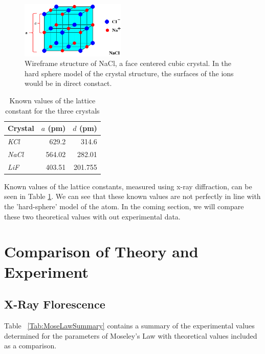 \documentclass[%
 reprint,
 amsmath,amssymb,
 aps,
 pra,
]{revtex4-1}
\begin{document}
\begin{figure}[H]
	\centering
	\includegraphics[width=5cm]{nacl_lattice.png}
	\caption{Wireframe structure of NaCl, a face centered cubic crystal. In the hard sphere model of the crystal structure, the surfaces of the ions would be in direct constact.}
	\label{fig:lattice_nacl}
\end{figure}

\begin{table}[htbp]
	\begin{center}
	\begin{tabular}{|l|r|r|}
		\hline
		\textbf{Crystal} & \multicolumn{1}{l|}{\textbf{$a$ (pm)}} & \multicolumn{1}{l|}{\textbf{$d$ (pm)}} \\ \hline
		\textit{KCl} & 629.2 & 314.6 \\ \hline
		\textit{NaCl} & 564.02 & 282.01 \\ \hline
		\textit{LiF} & 403.51 & 201.755 \\ \hline
	\end{tabular}
	\end{center}
	\caption{Known values of the lattice constant for the three crystals}
	\label{table:known_d}
\end{table}

Known values\cite{lattice, lattice2, lattice3} of the lattice constants, measured using x-ray diffraction, can be seen in Table \ref{table:known_d}. We can see that these known values are not perfectly in line with the 'hard-sphere' model of the atom. In the coming section, we will compare these two theoretical values with out experimental data.


\section{Comparison of Theory and Experiment}

\subsection{X-Ray Florescence}

Table ~\ref{Tab:MoseLawSummary} contains a summary of the experimental values determined for the parameters of Moseley's Law with theoretical values included as a comparison.
\end{document}
